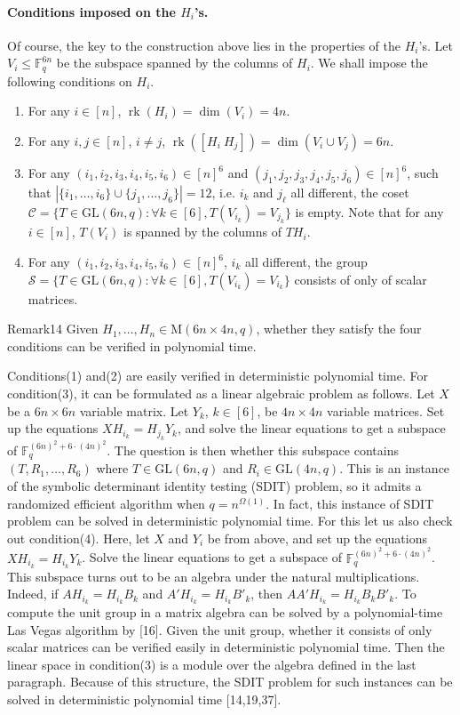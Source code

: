 \paragraph{Conditions imposed on the $H_i$'s.} Of course, the key to the construction above lies in the properties of the $H_i$'s. Let $V_i\le\mathbb F_q^{6n}$ be the subspace spanned by the columns of $H_i$. We shall impose the following conditions on $H_i$.
\begin{enumerate}
\item For any $i\in[n]$, $\operatorname{rk}(H_i)=\dim(V_i)=4n$.
\item For any $i,j\in[n]$, $i\ne j$, $\operatorname{rk}([H_i\ H_j])=\dim(V_i\cup V_j)=6n$.
\item For any $(i_1,i_2,i_3,i_4,i_5,i_6)\in[n]^6$ and $(j_1,j_2,j_3,j_4,j_5,j_6)\in[n]^6$, such that $|\{i_1,\ldots,i_6\}\cup\{j_1,\ldots,j_6\}|=12$, i.e. $i_k$ and $j_\ell$ all different, the coset $\mathcal C=\{T\in\mathrm{GL}(6n,q):\forall k\in[6],T(V_{i_k})=V_{j_k}\}$ is empty. Note that for any $i\in[n]$, $T(V_i)$ is spanned by the columns of $TH_i$.
\item For any $(i_1,i_2,i_3,i_4,i_5,i_6)\in[n]^6$, $i_k$ all different, the group $\mathcal S=\{T\in\mathrm{GL}(6n,q):\forall k\in[6],T(V_{i_k})=V_{i_k}\}$ consists of only of scalar matrices.
\end{enumerate}
\begin{authorclaim}{Remark14}
Given $H_1,\ldots,H_n\in\mathrm M(6n\times4n,q)$, whether they satisfy the four conditions can be verified in polynomial time.
\end{authorclaim}
Conditions(1) and(2) are easily verified in deterministic polynomial time.
For condition(3), it can be formulated as a linear algebraic problem as follows. Let $X$ be a $6n\times6n$ variable matrix. Let $Y_k$, $k\in[6]$, be $4n\times4n$ variable matrices. Set up the equations $XH_{i_k}=H_{j_k}Y_k$, and solve the linear equations to get a subspace of $\mathbb F_q^{(6n)^2+6\cdot(4n)^2}$. The question is then whether this subspace contains $(T,R_1,\ldots,R_6)$ where $T\in\mathrm{GL}(6n,q)$ and $R_i\in\mathrm{GL}(4n,q)$. This is an instance of the symbolic determinant identity testing (SDIT) problem, so it admits a randomized efficient algorithm when $q=n^{\Omega(1)}$.
In fact, this instance of SDIT problem can be solved in deterministic polynomial time. For this let us also check out condition(4). Here, let $X$ and $Y_i$ be from above, and set up the equations $XH_{i_k}=H_{i_k}Y_k$. Solve the linear equations to get a subspace of $\mathbb F_q^{(6n)^2+6\cdot(4n)^2}$. This subspace turns out to be an algebra under the natural multiplications. Indeed, if $AH_{i_k}=H_{i_k}B_k$ and $A'H_{i_k}=H_{i_k}B'_k$, then $AA'H_{i_k}=H_{i_k}B_kB'_k$. To compute the unit group in a matrix algebra can be solved by a polynomial-time Las Vegas algorithm by [16]. Given the unit group, whether it consists of only scalar matrices can be verified easily in deterministic polynomial time.
Then the linear space in condition(3) is a module over the algebra defined in the last paragraph. Because of this structure, the SDIT problem for such instances can be solved in deterministic polynomial time [14,19,37].
